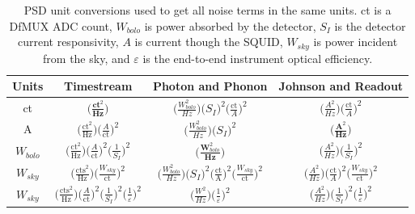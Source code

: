 \begin{table}[htp]
\begin{center}
\begin{tabular}{|c|c|c|c|}
\hline Units & Timestream & Photon and Phonon & Johnson and Readout \\ 
\hline ct & $\big( \frac{\textbf{ct}^2}{\textbf{Hz}} \big)$ & $\big( \frac{W_{bolo}^2}{Hz} \big)   \big( S_I \big) ^2 \big( \frac{\text{ct}}{A} \big) ^2$ & $\big( \frac{A^2}{Hz} \big) \big( \frac{\text{ct}}{A} \big) ^2 $ \\ 
\hline A & $\big( \frac{\text{ct}^2}{\text{Hz}} \big) \big( \frac{A}{\text{ct}} \big) ^2 $ & $\big( \frac{W_{bolo}^2}{Hz} \big) \big( S_I \big) ^2$ & $\big( \frac{\textbf{A}^2}{\textbf{Hz}} \big)$ \\ 
\hline $W_{bolo}$ & $\big( \frac{\text{ct}^2}{\text{Hz}} \big) \big( \frac{A}{\text{ct}} \big) ^2 \big( \frac{1}{S_I} \big) ^2$ & $\big( \frac{\textbf{W}_{bolo}^2}{\textbf{Hz}} \big)$ & $\big( \frac{A^2}{Hz} \big) \big( \frac{1}{S_I} \big) ^2$ \\ 
\hline $W_{sky}$ &  $\big( \frac{\text{cts}^2}{\text{Hz}} \big) \big( \frac{W_{sky}}{\text{ct}} \big) ^2$ & $\big( \frac{W_{bolo}^2}{Hz} \big) \big( S_I \big) ^2 \big( \frac{\text{ct}}{\text{A}} \big) ^2 \big( \frac{W_{sky}}{\text{ct}} \big) ^2$ & $\big( \frac{A^2}{Hz} \big) \big( \frac{\text{ct}}{A} \big) ^2 \big( \frac{W_{sky}}{\text{ct}} \big) ^2$ \\ 
\hline $W_{sky}$ & $\big( \frac{\text{cts}^2}{\text{Hz}} \big) \big( \frac{A}{\text{ct}} \big) ^2 \big( \frac{1}{S_I} \big) ^2 \big( \frac{1}{\varepsilon} \big) ^2$ & $\big( \frac{W^2}{Hz} \big)  \big( \frac{1}{\varepsilon} \big) ^2$ &  $\big( \frac{A^2}{Hz} \big) \big( \frac{1}{S_I} \big) ^2 \big( \frac{1}{\varepsilon} \big) ^2 $ \\
\hline
\end{tabular}
\end{center}
\caption[Unit conversions for noise equivalent power]{\ac{PSD} unit conversions used to get all noise terms in the same units. ct is a \ac{DfMUX} \ac{ADC} count, $W_{bolo}$ is power absorbed by the detector, $S_{I}$ is the detector current responsivity, $A$ is current though the \ac{SQUID}, $W_{sky}$ is power incident from the sky, and $\varepsilon$ is the end-to-end instrument optical efficiency. %
}
\label{tab:psd_table}
\end{table}


